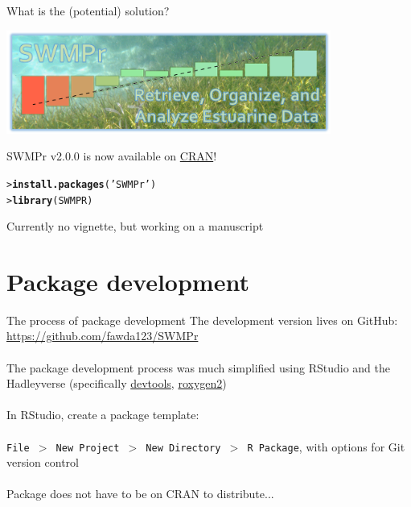 \documentclass[serif]{beamer}\usepackage[]{graphicx}\usepackage[]{color}
\makeatletter
\newcommand{\hlstr}[1]{\textcolor[rgb]{0.192,0.494,0.8}{#1}}%
\newcommand{\hlstd}[1]{\textcolor[rgb]{0.345,0.345,0.345}{#1}}%
\newcommand{\hlkwd}[1]{\textcolor[rgb]{0.737,0.353,0.396}{\textbf{#1}}}%
\newenvironment{kframe}{%
 \def\at@end@of@kframe{}%
 \ifinner\ifhmode%
  \def\at@end@of@kframe{\end{minipage}}%
  \begin{minipage}{\columnwidth}%
 \fi\fi%
 \def\FrameCommand##1{\hskip\@totalleftmargin \hskip-\fboxsep
 \colorbox{shadecolor}{##1}\hskip-\fboxsep
     \hskip-\linewidth \hskip-\@totalleftmargin \hskip\columnwidth}%
 \MakeFramed {\advance\hsize-\width
   \@totalleftmargin\z@ \linewidth\hsize
   \@setminipage}}%
 {\par\unskip\endMakeFramed%
 \at@end@of@kframe}
\newenvironment{knitrout}{}{} %
\makeatother
\begin{document}
\begin{frame}[fragile]{What is the (potential) solution?}
\centerline{\includegraphics[width = 0.8\textwidth]{fig/swmpr_logo.png}}
\vspace{0.15in}
SWMPr v2.0.0 is now available on \href{http://cran.r-project.org/web/packages/SWMPr/index.html}{CRAN}!
\begin{knitrout}
\color{fgcolor}\begin{kframe}
\begin{alltt}
\hlstd{> }\hlkwd{install.packages}\hlstd{(}\hlstr{'SWMPr'}\hlstd{)}
\hlstd{> }\hlkwd{library}\hlstd{(SWMPR)}
\end{alltt}
\end{kframe}
\end{knitrout}
Currently no vignette, but working on a manuscript
\end{frame}

\section{Package development}

\begin{frame}[fragile]{The process of package development}
The development version lives on GitHub: \href{https://github.com/fawda123/SWMPr}{https://github.com/fawda123/SWMPr} \\~\\
The package development process was much simplified using RStudio and the Hadleyverse (specifically \href{http://cran.r-project.org/web/packages/devtools/index.html}{devtools}, \href{http://cran.r-project.org/web/packages/roxygen2/index.html}{roxygen2}) \\~\\
In RStudio, create a package template: \\~\\
\texttt{File $>$ New Project $>$ New Directory $>$ R Package}, with options for Git version control \\~\\
Package does not have to be on CRAN to distribute...
\end{frame}
\end{document}
